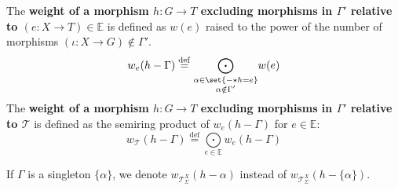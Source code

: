\begin{definition}
    \noindent
    The \textbf{weight of a morphism \(h : G \to T\) excluding morphisms in \( \Gamma' \) relative to $(e:X \to T) \in \mathbb{E}$} is defined as $w(e)$ raised to the power of the number of morphisms \( (\iota : X \to G) \notin \Gamma' \).
        \[
        w_e(h - \Gamma) \overset{\operatorname{def}}{=} \underset{
            \substack{\alpha \in \set{- \star h = e} \\
                        \alpha \notin \Gamma'}}{\bigodot} w(e)\] 
        The \textbf{weight of a morphism $h: G \to T$ excluding morphisms in \( \Gamma' \) relative to \(\mathcal{T}\)} is defined as the semiring product of $w_e(h-\Gamma)$ for $e \in \mathbb{E}$:
        \[ 
            w_\mathcal{T}(h-\Gamma) \overset{\operatorname{def}}{=} \underset{e \in \mathbb{E}}{\bigodot} 
        w_e(h-\Gamma)
                \]
\end{definition} 
    If \( \Gamma \) is a singleton \( \{ \alpha \} \), we denote \( w_{\mathcal{T}_\Sigma^X}(h - \alpha) \) instead of \( w_{\mathcal{T}_\Sigma^X}(h - \{ \alpha \}) \).